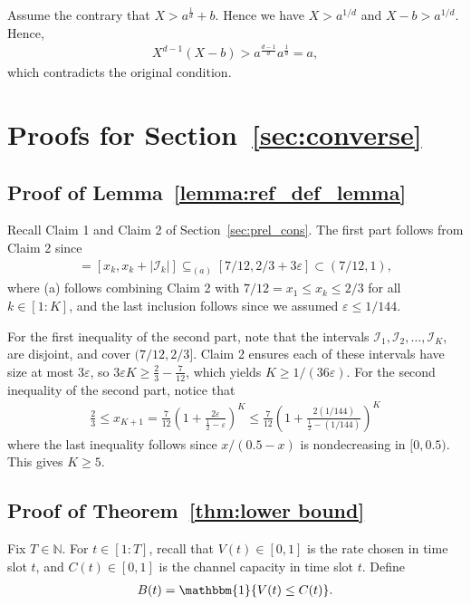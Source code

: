 \documentclass[12pt,draftcls, onecolumn]{IEEEtran}
\begin{document}
{Assume the contrary that $X >  a^{\frac{1}{d}} + b$. Hence we have $X > a^{1/d}$ and $X-b > a^{1/d}$. Hence, 
\begin{align}
  X^{d-1}(X-b) > a^{\frac{d-1}{d}} a^{\frac{1}{d}} = a, \nonumber
\end{align}
which contradicts the original condition. 

\section{Proofs for Section~\ref{sec:converse}}
\subsection{Proof of Lemma~\ref{lemma:ref_def_lemma}}\label{app:ref_def_lemma}
Recall Claim 1 and Claim 2 of Section~\ref{sec:prel_cons}.
The first part follows from Claim 2 since
       \begin{align}
          [x_k,x_{k+1}] = [x_k,x_k+|\mathcal{I}_k|]\subseteq_{(a)} [7/12, 2/3 +3\varepsilon] \subset (7/12,1), \nonumber
       \end{align}
       where (a) follows combining Claim 2 with $7/12 = x_1 \leq x_k \leq 2/3$ for all $k \in [1:K]$, and the last inclusion follows since we assumed $\varepsilon \leq 1/144$. 
       
       For the first inequality of the second part, note that the intervals $\mathcal{I}_1,\mathcal{I}_2,\dots,\mathcal{I}_K$, are disjoint, and cover $(7/12,2/3]$. Claim 2 ensures each of these intervals have size at most $3\varepsilon$, so $3\varepsilon K \geq \frac{2}{3} - \frac{7}{12}$, which yields $K \geq 1/(36\varepsilon)$. For the second inequality of the second part, notice that
       \begin{align}
           \frac{2}{3} \leq x_{K+1} = \frac{7}{12} \left(1+ \frac{2\varepsilon}{\frac{1}{2}-\varepsilon}\right)^{K} \leq \frac{7}{12}\left(1+ \frac{2(1/144)}{\frac{1}{2}-(1/144)}\right)^{K} \nonumber 
       \end{align}
       where the last inequality follows since $x/(0.5-x)$ is nondecreasing in $[0,0.5)$. This gives $K \geq 5$.
\subsection{Proof of Theorem~\ref{thm:lower bound}   }\label{app:lower_bound}

Fix $T \in \mathbb{N}$. For $t \in [1:T]$, recall that $V(t) \in[ 0,1]$ is the rate chosen in time slot $t$, and $C(t) \in [0,1]$ is the channel capacity in time slot $t$. Define 
\begin{align}
    B(t) = \mathbbm{1}\{V(t) \leq C(t) \}. \nonumber
\end{align}

}
\end{document}
